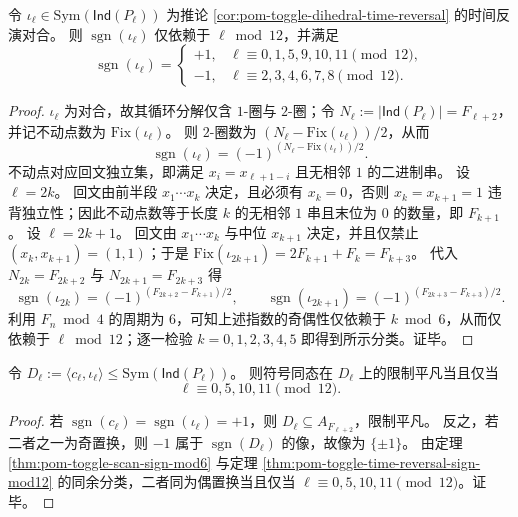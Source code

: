 \begin{theorem}\label{thm:pom-toggle-time-reversal-sign-mod12}
令 \(\iota_\ell\in\mathrm{Sym}(\mathsf{Ind}(P_\ell))\) 为推论 \ref{cor:pom-toggle-dihedral-time-reversal} 的时间反演对合。
则 \(\operatorname{sgn}(\iota_\ell)\) 仅依赖于 \(\ell\bmod 12\)，并满足
\[
\operatorname{sgn}(\iota_\ell)=
\begin{cases}
+1,& \ell\equiv 0,1,5,9,10,11\pmod{12},\\
-1,& \ell\equiv 2,3,4,6,7,8\pmod{12}.
\end{cases}
\]
\end{theorem}

\begin{proof}
\(\iota_\ell\) 为对合，故其循环分解仅含 \(1\)-圈与 \(2\)-圈；令 \(N_\ell:=|\mathsf{Ind}(P_\ell)|=F_{\ell+2}\)，并记不动点数为 \(\mathrm{Fix}(\iota_\ell)\)。
则 \(2\)-圈数为 \((N_\ell-\mathrm{Fix}(\iota_\ell))/2\)，从而
\[
\operatorname{sgn}(\iota_\ell)=(-1)^{(N_\ell-\mathrm{Fix}(\iota_\ell))/2}.
\]
不动点对应回文独立集，即满足 \(x_i=x_{\ell+1-i}\) 且无相邻 \(1\) 的二进制串。
设 \(\ell=2k\)。
回文由前半段 \(x_1\cdots x_k\) 决定，且必须有 \(x_k=0\)，否则 \(x_k=x_{k+1}=1\) 违背独立性；因此不动点数等于长度 \(k\) 的无相邻 \(1\) 串且末位为 \(0\) 的数量，即 \(F_{k+1}\)。
设 \(\ell=2k+1\)。
回文由 \(x_1\cdots x_k\) 与中位 \(x_{k+1}\) 决定，并且仅禁止 \((x_k,x_{k+1})=(1,1)\)；于是
\(
\mathrm{Fix}(\iota_{2k+1})=2F_{k+1}+F_k=F_{k+3}
\)。
代入 \(N_{2k}=F_{2k+2}\) 与 \(N_{2k+1}=F_{2k+3}\) 得
\[
\operatorname{sgn}(\iota_{2k})=(-1)^{(F_{2k+2}-F_{k+1})/2},
\qquad
\operatorname{sgn}(\iota_{2k+1})=(-1)^{(F_{2k+3}-F_{k+3})/2}.
\]
利用 \(F_n\bmod 4\) 的周期为 \(6\)，可知上述指数的奇偶性仅依赖于 \(k\bmod 6\)，从而仅依赖于 \(\ell\bmod 12\)；逐一检验 \(k=0,1,2,3,4,5\) 即得到所示分类。证毕。
\end{proof}

\begin{corollary}[二面体核的取向特征]\label{cor:pom-toggle-dihedral-orientation-character}
令 \(D_\ell:=\langle c_\ell,\iota_\ell\rangle\le \mathrm{Sym}(\mathsf{Ind}(P_\ell))\)。
则符号同态在 \(D_\ell\) 上的限制平凡当且仅当
\[
\ell\equiv 0,5,10,11\pmod{12}.
\]
\end{corollary}

\begin{proof}
若 \(\operatorname{sgn}(c_\ell)=\operatorname{sgn}(\iota_\ell)=+1\)，则 \(D_\ell\subseteq A_{F_{\ell+2}}\)，限制平凡。
反之，若二者之一为奇置换，则 \(-1\) 属于 \(\operatorname{sgn}(D_\ell)\) 的像，故像为 \(\{\pm 1\}\)。
由定理 \ref{thm:pom-toggle-scan-sign-mod6} 与定理 \ref{thm:pom-toggle-time-reversal-sign-mod12} 的同余分类，二者同为偶置换当且仅当 \(\ell\equiv 0,5,10,11\pmod{12}\)。证毕。
\end{proof}



